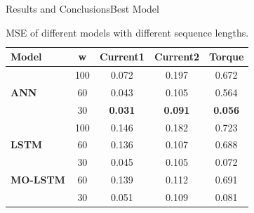 \documentclass[handout]{beamer}
\begin{document}
\begin{frame}{Results and Conclusions}{Best Model}
\begin{table}[]
  \begin{tabular}{l c c c c}
  \toprule[0.2mm]
   \textbf{Model} & \textbf{w} & \textbf{Current1} & \textbf{Current2} & \textbf{Torque}\\
   \midrule
   & 100 & 0.072 & 0.197 & 0.672 \\
   \textbf{ANN} & 60 & 0.043 & 0.105 & 0.564 \\
   & 30 & \textbf{0.031} & \textbf{0.091} & \textbf{0.056} \\
   \midrule
   & 100 & 0.146 & 0.182 & 0.723 \\
   \textbf{LSTM} & 60 & 0.136 & 0.107 & 0.688 \\
   & 30 & 0.045 & 0.105 & 0.072 \\
   \midrule
   \textbf{MO-LSTM} & 60 & 0.139 & 0.112 & 0.691 \\
   & 30 & 0.051 & 0.109 & 0.081 \\
   \bottomrule
  \end{tabular}
  \caption{MSE of different models with different sequence lengths.}
  \end{table}
\end{frame}
%
\end{document}
